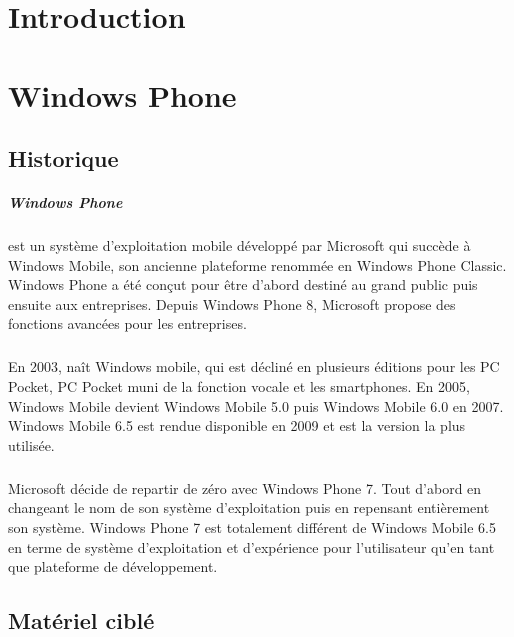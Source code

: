 \documentclass[twoside,UTF8]{EPURapport}
\begin{document}
\chapter{Introduction}


\chapter{Windows Phone}
\section{Historique}

\paragraph{Windows Phone} est un système d'exploitation mobile développé par Microsoft qui succède à Windows Mobile, son ancienne plateforme renommée en Windows Phone Classic. Windows Phone a été conçut pour être d'abord destiné au grand public puis ensuite aux entreprises. Depuis Windows Phone 8, Microsoft propose des fonctions avancées pour les entreprises.

\paragraph{}
En 2003, naît Windows mobile, qui est décliné en plusieurs éditions pour les PC Pocket, PC Pocket muni de la fonction vocale et les smartphones. En 2005, Windows Mobile devient Windows Mobile 5.0 puis Windows Mobile 6.0 en 2007. Windows Mobile 6.5 est rendue disponible en 2009 et est la version la plus utilisée. 

\paragraph{}
Microsoft décide de repartir de zéro avec Windows Phone 7. Tout d'abord en changeant le nom de son système d'exploitation puis en repensant entièrement son système. Windows Phone 7 est totalement différent de Windows Mobile 6.5 en terme de système d'exploitation et d'expérience pour l'utilisateur qu'en tant que plateforme de développement. 
 

\section{Matériel ciblé}
\end{document}
